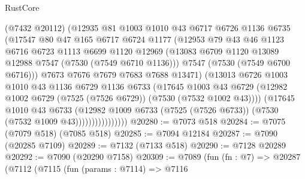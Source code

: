 \begin{lexlean}{RustCore}
\begin{coremodule}
                        (@7432 @20112)
                        (@12935
                          @81
                          @1003
                          @1010
                          @43
                          @6717
                          @6726
                          @1136
                          @6735
                          (@17547
                            @80
                            @47
                            @165
                            @6717
                            @6724
                            @1177
                            (@12953
                              @79
                              @43
                              @46
                              @1123
                              @6716
                              @6723
                              @1113
                              @6699
                              @1120
                              @12969
                              (@13083 @6709 @1120 @13089 @12988 @7547 (@7530 (@7549 @6710 @1136)))
                              @7547
                              (@7530 (@7549 @6700 @6716)))
                            @7673
                            @7676
                            @7679
                            @7683
                            @7688
                            @13471)
                          (@13013
                            @6726
                            @1003
                            @1010
                            @43
                            @1136
                            @6729
                            @1136
                            @6733
                            (@17645
                              @1003
                              @43
                              @6729
                              (@12982 @1002 @6729 (@7525 (@7526 @6729)) (@7530 (@7532 @1002 @43))))
                            (@17645
                              @1010
                              @43
                              @6733
                              (@12982
                                @1009
                                @6733
                                (@7525 (@7526 @6733))
                                (@7530 (@7532 @1009 @43))))))))))))))))
@20280 := @7073 @518
@20284 := @7075 (@7079 @518) (@7085 @518)
@20285 := @7094 @12184
@20287 := @7090 (@20285 @7109)
@20289 := @7132 (@7133 @518)
@20290 := @7128 @20289
@20292 := @7090 (@20290 @7158)
@20309 := @7089
    (fun (fn : @7) =>
    @20287
      (@7112
        (@7115
          (fun (params : @7114) =>
          @7116

\end{coremodule}
\end{lexlean}
